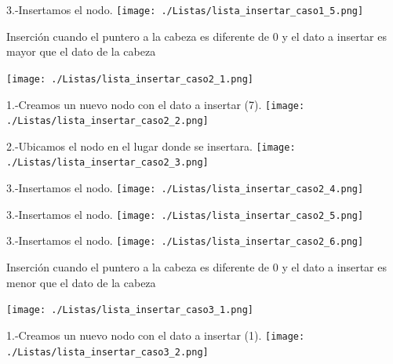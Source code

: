 \documentclass{beamer}
\begin{document}
  
\begin{frame}
  3.-Insertamos el nodo.
  \texttt{[image: ./Listas/lista\_insertar\_caso1\_5.png]}  
   
  
\end{frame}



\begin{frame}
  Inserción cuando el puntero a la cabeza es diferente de  0 y el dato a insertar es mayor que el dato de la cabeza
  
  \texttt{[image: ./Listas/lista\_insertar\_caso2\_1.png]}
  
\end{frame}

\begin{frame}
  1.-Creamos un nuevo nodo con el dato a insertar (7).
  \texttt{[image: ./Listas/lista\_insertar\_caso2\_2.png]}
  
\end{frame}

\begin{frame}
  2.-Ubicamos el nodo en el lugar donde se insertara.
  \texttt{[image: ./Listas/lista\_insertar\_caso2\_3.png]}
  
\end{frame}

\begin{frame}
  3.-Insertamos el nodo.
  \texttt{[image: ./Listas/lista\_insertar\_caso2\_4.png]}  
   
  
\end{frame}

\begin{frame}
  3.-Insertamos el nodo.
  \texttt{[image: ./Listas/lista\_insertar\_caso2\_5.png]}  
   
  
\end{frame}

\begin{frame}
  3.-Insertamos el nodo.
  \texttt{[image: ./Listas/lista\_insertar\_caso2\_6.png]}  
   
  
\end{frame}

\begin{frame}
  Inserción cuando el puntero a la cabeza es diferente de  0 y el dato a insertar es menor que el dato de la cabeza
  
  \texttt{[image: ./Listas/lista\_insertar\_caso3\_1.png]}
  
\end{frame}

\begin{frame}
  1.-Creamos un nuevo nodo con el dato a insertar (1).
  \texttt{[image: ./Listas/lista\_insertar\_caso3\_2.png]}
  
\end{frame}
\end{document}
